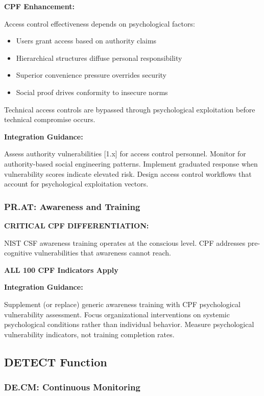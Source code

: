 \documentclass[11pt,a4paper]{article}
\begin{document}
\textbf{CPF Enhancement:}

Access control effectiveness depends on psychological factors:

\begin{itemize}
\item Users grant access based on authority claims
\item Hierarchical structures diffuse personal responsibility
\item Superior convenience pressure overrides security
\item Social proof drives conformity to insecure norms
\end{itemize}

Technical access controls are bypassed through psychological exploitation before technical compromise occurs.

\textbf{Integration Guidance:}

Assess authority vulnerabilities [1.x] for access control personnel. Monitor for authority-based social engineering patterns. Implement graduated response when vulnerability scores indicate elevated risk. Design access control workflows that account for psychological exploitation vectors.

\subsubsection{PR.AT: Awareness and Training}

\textbf{CRITICAL CPF DIFFERENTIATION:}

NIST CSF awareness training operates at the conscious level. CPF addresses pre-cognitive vulnerabilities that awareness cannot reach.

\textbf{ALL 100 CPF Indicators Apply}

\textbf{Integration Guidance:}

Supplement (or replace) generic awareness training with CPF psychological vulnerability assessment. Focus organizational interventions on systemic psychological conditions rather than individual behavior. Measure psychological vulnerability indicators, not training completion rates.

\subsection{DETECT Function}

\subsubsection{DE.CM: Continuous Monitoring}
\end{document}
